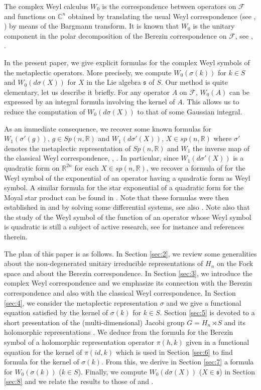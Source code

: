 \documentclass[12pt]{amsart}
\numberwithin{equation}{section}
\begin{document}
The complex Weyl calculus $W_0$ is the correspondence between operators on $\mathcal F$ and functions on ${\mathbb C}^n$ obtained by translating the usual Weyl correspondence
(see \cite{Fo}, \cite{Ho1}) by means of the Bargmann transform. It is known that $W_0$
is the unitary component in the polar decomposition of the Berezin correspondence on $\mathcal F$, see \cite{Luo}, \cite{CaRiv}.

In the present paper, we give explicit formulas for the complex Weyl symbols of the metaplectic operators. More precisely, we compute $W_0(\sigma(k))$ for $k\in S$ and $W_0(d\sigma(X))$
for $X$ in the Lie algebra $\mathfrak s$ of $S$. Our method is quite elementary, let us describe it briefly. For any operator $A$ on $\mathcal F$, $W_0(A)$ can be expressed by an integral formula involving the kernel of $A$. This allows us to reduce the computation of  $W_0(d\sigma(X))$ to that of some Gaussian integral. 

As an immediate consequence, we recover some known formulas for $W_1(\sigma'(g))$, $g\in Sp(n,{\mathbb R})$ and 
 $W_1(d\sigma'(X))$, $X\in sp(n,{\mathbb R})$ where $\sigma'$ denotes the metaplectic representation of $Sp(n,{\mathbb R})$ and $W_1$ the inverse map of the classical Weyl correspondence, \cite{Fo}, \cite{CR1}. In particular, since $W_1(d\sigma'(X))$ is a quadratic form on ${\mathbb R}^{2n}$ for each $X\in sp(n,{\mathbb R})$, we recover a formula of \cite{Ho2} for the Weyl symbol of the exponential of an operator having a quadratic form as Weyl symbol. A similar formula for the star exponential
of a quadratic form for the Moyal star product can be found in \cite{BM}. Note that these formulas were then established in  \cite{Ho2} and \cite{BM} by solving some differential systems, see also \cite{CR2}. Note also that the study of the Weyl symbol of the function of an operator whose Weyl symbol is quadratic is still a subject of active research, see for instance
\cite{Der2} and references therein.

The plan of this paper is as follows. In Section \ref{sec:2}, we review some generalities
about the non-degenerated unitary irreducible representations of $H_n$ on the Fock space
and about the Berezin correspondence. In Section \ref{sec:3}, we introduce the complex Weyl correspondence and we emphasize its connection with the Berezin correspondence and also with
the classical Weyl correspondence. In Section \ref{sec:4}, we consider the metaplectic representation $\sigma$ and we give a functional equation satisfied by the kernel of $\sigma(k)$ for $k\in S$.
Section \ref{sec:5} is devoted to a short presentation of the (multi-dimensional) Jacobi group
$G=H_n\rtimes S$ and its holomorphic representations \cite{Bern}. We deduce from the
formula for the Berezin symbol of a holomorphic representation operator  $\pi(h,k)$ given in
\cite{CaPad2} a functional equation for the kernel of $\pi(id,k)$ which is used in Section \ref{sec:6} to find formula for the kernel of $\sigma(k)$. From this, we derive in Section \ref{sec:7} a formula for $W_0(\sigma(k))$ ($k\in S$). Finally, we compute $W_0(d\sigma(X))$ ($X\in {\mathfrak s}$) in Section \ref{sec:8} and we relate the results to those of \cite{Ho2} and \cite{BM}.
\end{document}
